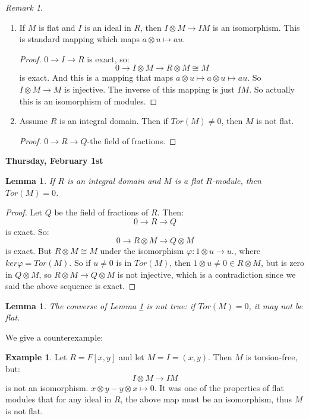 \documentclass[12pt]{amsbook}
\theoremstyle{plain}
\numberwithin{section}{chapter}
\numberwithin{equation}{chapter}
\newtheorem{lem}[theorem]{Lemma}
\theoremstyle{definition}
\newtheorem{Ex}[theorem]{Example}
\theoremstyle{remark}
\newtheorem{rem}[theorem]{Remark}
\newcommand{\tens}{\otimes}
\renewcommand{\phi}{\varphi}
\begin{document}
\begin{rem}
\begin{enumerate}
\begin{proof}
\end{proof}

\item If $M$ is flat and $I$ is an ideal in $R$, then $I \tens M \to IM$ is an isomorphism. This is standard mapping which maps $a \tens u \mapsto au$. 

\begin{proof}
$0 \to I \to R$ is exact, so:
$$
0 \to I \tens M \to R \tens M \cong M
$$
 is exact. And this is a mapping that maps $a \tens u \mapsto a \tens u \mapsto au$. So $I \tens M \to M$ is injective. The inverse of this mapping is just $IM$. So actually this is an isomorphism of modules. 
\end{proof}

\item Assume $R$ is an integral domain. Then if $Tor(M) \neq 0$, then $M$ is not flat. 

\begin{proof}
$0 \to R \to Q$-the field of fractions. 
\end{proof}

\end{enumerate}

\end{rem}

\textbf{Thursday, February 1st}

\begin{lem}\label{lem10.148}
If $R$ is an integral domain and $M$ is a flat $R$-module, then $Tor(M) = 0$. 
\end{lem}

\begin{proof}
Let $Q$ be the field of fractions of $R$. Then:
$$
0 \to R \to Q
$$
 is exact. So:
$$
0 \to R \tens M \to Q \tens M
$$
 is exact. But $R \tens M \cong M$ under the isomorphism $\phi:1 \tens u \to u$., where $ker\phi = Tor(M)$. So if $u \neq 0$ is in $Tor(M)$, then $1 \tens u \neq 0 \in R \tens M$, but is zero in $Q \tens M$, so $R \tens M \to Q \tens M$ is not injective, which is a contradiction since we said the above sequence is exact. 
\end{proof}

\begin{lem}
The converse of Lemma \ref{lem10.148} is not true: if $Tor(M) = 0$, it may not be flat. 
\end{lem}
We give a counterexample:
\begin{Ex}
Let $R = F[x,y]$ and let $M = I = (x,y)$. Then $M$ is torsion-free, but:
$$
I \tens M \to IM
$$ 
is not an isomorphism. $x \tens y - y \tens x \mapsto 0$. It was one of the properties of flat modules that for any ideal in $R$, the above map must be an isomorphism, thus $M$ is not flat. 
\end{Ex}
\end{document}
